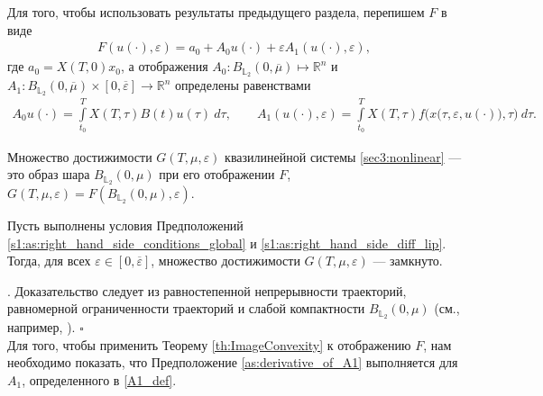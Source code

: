 \documentclass[../main.tex]{subfiles}
\begin{document}
Для того, чтобы использовать результаты предыдущего раздела, перепишем $F$ в виде
\begin{gather*}
 F(u(\cdot),\varepsilon) = a_0 + A_0 u(\cdot) + \varepsilon A_1(u(\cdot), \varepsilon), 
\end{gather*}
где $a_0 = X(T,0)x_0 $, а отображения $A_0: B_{\mathbb{L}_2}(0,\overline{\mu}) \mapsto \mathbb{R}^n$ и $A_1: B_{\mathbb{L}_2}(0,\overline{\mu}) \times [0,\overline{\varepsilon}] \to \mathbb{R}^n$ определены равенствами
\begin{gather}\label{A1_def}
 A_0 u(\cdot) = \int\limits_{t_0}^T X(T,\tau) B(t)u(\tau)\ d\tau, \qquad
 A_1(u(\cdot),\varepsilon) = \int\limits_{t_0}^T X(T,\tau) f\Big(x\big(\tau,\varepsilon, u(\cdot)\big),\tau\Big) \ d\tau.
\end{gather}

Множество достижимости $G(T,\mu,\varepsilon) $ квазилинейной системы \eqref{sec3:nonlinear} --- это образ шара $B_{\mathbb{L}_2}(0,\mu)$ при его отображении $F$, $G(T,\mu,\varepsilon) = F(B_{\mathbb{L}_2}(0,\mu),\varepsilon)$.

\begin{utv}\label{ReachableSetcloseness}
 Пусть выполнены условия Предположений \ref{s1:as:right_hand_side_conditions_global} и \ref{s1:as:right_hand_side_diff_lip}. 
Тогда, для всех $\varepsilon\in [0,\overline{\varepsilon}]$, множество достижимости $G(T,\mu,\varepsilon) $ --- замкнуто.
\end{utv}
\doc. 
Доказательство следует из равностепенной непрерывности траекторий, равномерной ограниченности траекторий и слабой компактности $B_{\mathbb{L}_2}(0,\mu)$ (см., например, \cite{GusZyk}).
\hfill$\square$\\[1ex]%

Для того, чтобы применить Теорему \ref{th:ImageConvexity} к отображению $F$, нам необходимо показать, что Предположение \ref{as:derivative_of_A1} выполняется для $A_1$, определенного в \eqref{A1_def}.
\end{document}

